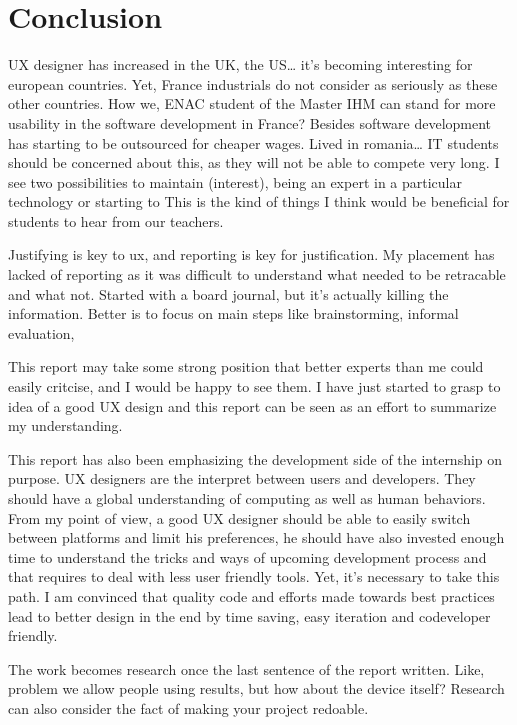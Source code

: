 \section{Conclusion}

UX designer has increased in the UK, the US\ldots{} it's becoming
interesting for european countries. Yet, France industrials do not
consider as seriously as these other countries. How we, ENAC student of
the Master IHM can stand for more usability in the software development
in France? Besides software development has starting to be outsourced
for cheaper wages. Lived in romania\ldots{} IT students should be
concerned about this, as they will not be able to compete very long. I
see two possibilities to maintain (interest), being an expert in a
particular technology or starting to This is the kind of things I think
would be beneficial for students to hear from our teachers.

Justifying is key to ux, and reporting is key for justification. My
placement has lacked of reporting as it was difficult to understand what
needed to be retracable and what not. Started with a board journal, but
it's actually killing the information. Better is to focus on main steps
like brainstorming, informal evaluation,

This report may take some strong position that better experts than me
could easily critcise, and I would be happy to see them. I have just
started to grasp to idea of a good UX design and this report can be seen
as an effort to summarize my understanding.

This report has also been emphasizing the development side of the
internship on purpose. UX designers are the interpret between users and
developers. They should have a global understanding of computing as well
as human behaviors. From my point of view, a good UX designer should be
able to easily switch between platforms and limit his preferences, he
should have also invested enough time to understand the tricks and ways
of upcoming development process and that requires to deal with less user
friendly tools. Yet, it's necessary to take this path. I am convinced
that quality code and efforts made towards best practices lead to better
design in the end by time saving, easy iteration and codeveloper
friendly.

The work becomes research once the last sentence of the report written.
Like, problem we allow people using results, but how about the device
itself? Research can also consider the fact of making your project
redoable.
